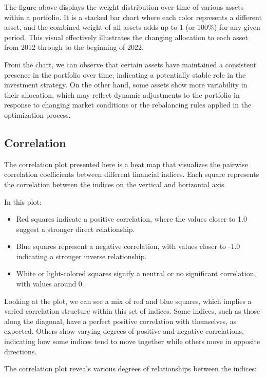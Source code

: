 \documentclass[11pt,preprint, authoryear]{elsarticle}
\numberwithin{equation}{section}
\numberwithin{figure}{section}
\numberwithin{table}{section}
\def\tightlist{} %
\begin{document}
The figure above displays the weight distribution over time of various
assets within a portfolio. It is a stacked bar chart where each color
represents a different asset, and the combined weight of all assets adds
up to 1 (or 100\%) for any given period. This visual effectively
illustrates the changing allocation to each asset from 2012 through to
the beginning of 2022.

From the chart, we can observe that certain assets have maintained a
consistent presence in the portfolio over time, indicating a potentially
stable role in the investment strategy. On the other hand, some assets
show more variability in their allocation, which may reflect dynamic
adjustments to the portfolio in response to changing market conditions
or the rebalancing rules applied in the optimization process.

\hypertarget{correlation}{%
\subsection{Correlation}\label{correlation}}

The correlation plot presented here is a heat map that visualizes the
pairwise correlation coefficients between different financial indices.
Each square represents the correlation between the indices on the
vertical and horizontal axis.

In this plot:

\begin{itemize}
\tightlist
\item
  Red squares indicate a positive correlation, where the values closer
  to 1.0 suggest a stronger direct relationship.
\item
  Blue squares represent a negative correlation, with values closer to
  -1.0 indicating a stronger inverse relationship.
\item
  White or light-colored squares signify a neutral or no significant
  correlation, with values around 0.
\end{itemize}

Looking at the plot, we can see a mix of red and blue squares, which
implies a varied correlation structure within this set of indices. Some
indices, such as those along the diagonal, have a perfect positive
correlation with themselves, as expected. Others show varying degrees of
positive and negative correlations, indicating how some indices tend to
move together while others move in opposite directions.

The correlation plot reveals various degrees of relationships between
the indices:
\end{document}
